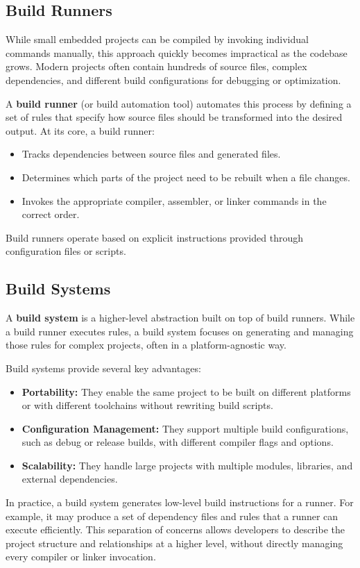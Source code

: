 \subsection{Build Runners}
While small embedded projects can be compiled by invoking individual commands manually, this approach quickly becomes impractical as the codebase grows. 
Modern projects often contain hundreds of source files, complex dependencies, and different build configurations for debugging or optimization. 

A \textbf{build runner} (or build automation tool) automates this process by defining a set of rules that specify how source files should be transformed into the desired output.
At its core, a build runner:
\begin{itemize}
	\item Tracks dependencies between source files and generated files.
	\item Determines which parts of the project need to be rebuilt when a file changes.
	\item Invokes the appropriate compiler, assembler, or linker commands in the correct order.
\end{itemize}

Build runners operate based on explicit instructions provided through configuration files or scripts.
\subsection{Build Systems}
A \textbf{build system} is a higher-level abstraction built on top of build runners.
While a build runner executes rules, a build system focuses on generating and managing those rules for complex projects, often in a platform-agnostic way.

Build systems provide several key advantages:
\begin{itemize}
	\item \textbf{Portability:} They enable the same project to be built on different platforms or with different toolchains without rewriting build scripts.
	\item \textbf{Configuration Management:} They support multiple build configurations, such as debug or release builds, with different compiler flags and options.
	\item \textbf{Scalability:} They handle large projects with multiple modules, libraries, and external dependencies.
\end{itemize}

In practice, a build system generates low-level build instructions for a runner. 
For example, it may produce a set of dependency files and rules that a runner can execute efficiently. 
This separation of concerns allows developers to describe the project structure and relationships at a higher level, without directly managing every compiler or linker invocation.

